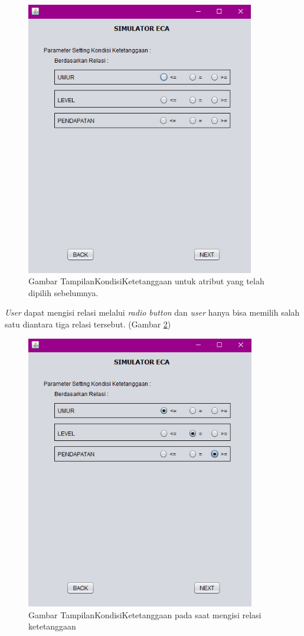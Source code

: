 \begin{enumerate}
	\begin{figure} [H]
	\centering  
	\includegraphics[width=10cm, height=12cm]{tampilanImplementasiKetetanggaan} 
		\caption[Gambar TampilanKondisiKetetanggaan]{Gambar TampilanKondisiKetetanggaan untuk atribut yang telah dipilih sebelumnya.}
	\label{fig:tampilantetangga} 
\end{figure}

	\textit{User} dapat mengisi relasi melalui \textit{radio button} dan \textit{user} hanya bisa memilih salah satu diantara tiga relasi tersebut. (Gambar \ref{fig:tampilantetangga1})
	
	\begin{figure} [H]
	\centering  
	\includegraphics[width=10cm, height=12cm]{tampilanImplementasiKetetanggaan1} 
		\caption[Gambar TampilanKetetanggaan]{Gambar TampilanKondisiKetetanggaan pada saat mengisi relasi ketetanggaan}
	\label{fig:tampilantetangga1} 
\end{figure}


\end{enumerate}
